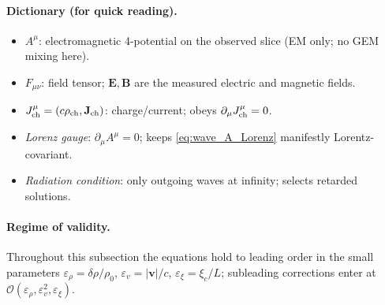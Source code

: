 \paragraph{Dictionary (for quick reading).}
\begin{itemize}
\item \(A^\mu\): electromagnetic 4-potential on the observed slice (EM only; no GEM mixing here).
\item \(F_{\mu\nu}\): field tensor; \(\mathbf E,\mathbf B\) are the measured electric and magnetic fields.
\item \(J^\mu_{\rm ch}=(c\rho_{\rm ch},\mathbf J_{\rm ch})\): charge/current; obeys \(\partial_\mu J^\mu_{\rm ch}=0\).
\item \emph{Lorenz gauge}: \(\partial_\mu A^\mu=0\); keeps \eqref{eq:wave_A_Lorenz} manifestly Lorentz-covariant.
\item \emph{Radiation condition}: only outgoing waves at infinity; selects retarded solutions.
\end{itemize}

\paragraph{Regime of validity.}
Throughout this subsection the equations hold to leading order in the small parameters
\(\varepsilon_\rho=\delta\rho/\rho_0\),
\(\varepsilon_v=|\mathbf v|/c\),
\(\varepsilon_\xi=\xi_c/L\);
subleading corrections enter at \(\mathcal O(\varepsilon_\rho,\varepsilon_v^2,\varepsilon_\xi)\).

